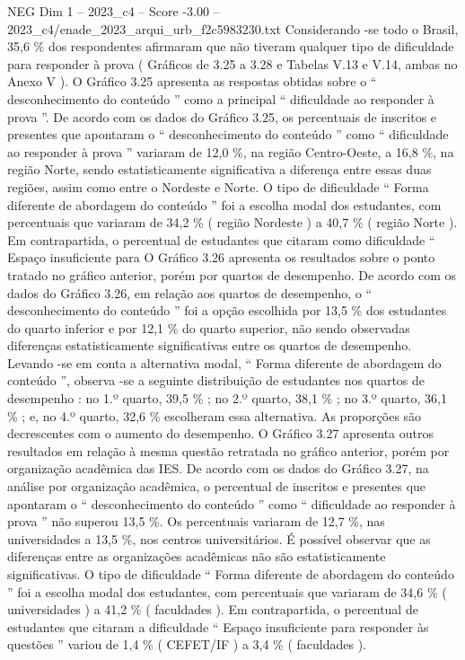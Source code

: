 \begin{textsample}{NEG Dim 1 – 2023\_c4 – Score -3.00 – 2023\_c4/enade\_2023\_arqui\_urb\_f2c5983230.txt}
Considerando -se todo o Brasil, 35,6 \% dos respondentes afirmaram que não tiveram qualquer tipo de dificuldade para responder à prova ( Gráficos de 3.25 a 3.28 e Tabelas V.13 e V.14, ambas no Anexo V ).
O Gráfico 3.25 apresenta as respostas obtidas sobre o “ desconhecimento do conteúdo ” como a principal “ dificuldade ao responder à prova ”.
De acordo com os dados do Gráfico 3.25, os percentuais de inscritos e presentes que apontaram o “ desconhecimento do conteúdo ” como “ dificuldade ao responder à prova ” variaram de 12,0 \%, na região Centro-Oeste, a 16,8 \%, na região Norte, sendo estatisticamente significativa a diferença entre essas duas regiões, assim como entre o Nordeste e Norte.
O tipo de dificuldade “ Forma diferente de abordagem do conteúdo ” foi a escolha modal dos estudantes, com percentuais que variaram de 34,2 \% ( região Nordeste ) a 40,7 \% ( região Norte ).
Em contrapartida, o percentual de estudantes que citaram como dificuldade “ Espaço insuficiente para O Gráfico 3.26 apresenta os resultados sobre o ponto tratado no gráfico anterior, porém por quartos de desempenho.
De acordo com os dados do Gráfico 3.26, em relação aos quartos de desempenho, o “ desconhecimento do conteúdo ” foi a opção escolhida por 13,5 \% dos estudantes do quarto inferior e por 12,1 \% do quarto superior, não sendo observadas diferenças estatisticamente significativas entre os quartos de desempenho.
Levando -se em conta a alternativa modal, “ Forma diferente de abordagem do conteúdo ”, observa -se a seguinte distribuição de estudantes nos quartos de desempenho : no 1.º quarto, 39,5 \% ; no 2.º quarto, 38,1 \% ; no 3.º quarto, 36,1 \% ; e, no 4.º quarto, 32,6 \% escolheram essa alternativa.
As proporções são decrescentes com o aumento do desempenho.
O Gráfico 3.27 apresenta outros resultados em relação à mesma questão retratada no gráfico anterior, porém por organização acadêmica das IES.
De acordo com os dados do Gráfico 3.27, na análise por organização acadêmica, o percentual de inscritos e presentes que apontaram o “ desconhecimento do conteúdo ” como “ dificuldade ao responder à prova ” não superou 13,5 \%.
Os percentuais variaram de 12,7 \%, nas universidades a 13,5 \%, nos centros universitários.
É possível observar que as diferenças entre as organizações acadêmicas não são estatisticamente significativas.
O tipo de dificuldade “ Forma diferente de abordagem do conteúdo ” foi a escolha modal dos estudantes, com percentuais que variaram de 34,6 \% ( universidades ) a 41,2 \% ( faculdades ).
Em contrapartida, o percentual de estudantes que citaram a dificuldade “ Espaço insuficiente para responder às questões ” variou de 1,4 \% ( CEFET/IF ) a 3,4 \% ( faculdades ).

\end{textsample}
